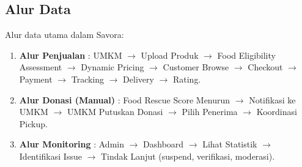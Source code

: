 \subsection{Alur Data}

Alur data utama dalam Savora:

\begin{enumerate}[leftmargin=*]
    \item \textbf{Alur Penjualan} : UMKM $\rightarrow$ Upload Produk $\rightarrow$ Food Eligibility Assessment $\rightarrow$ Dynamic Pricing $\rightarrow$ Customer Browse $\rightarrow$ Checkout $\rightarrow$ Payment $\rightarrow$ Tracking $\rightarrow$ Delivery $\rightarrow$ Rating.
    
    \item \textbf{Alur Donasi (Manual)} : Food Rescue Score Menurun $\rightarrow$ Notifikasi ke UMKM $\rightarrow$ UMKM Putuskan Donasi $\rightarrow$ Pilih Penerima $\rightarrow$ Koordinasi Pickup.
    
    \item \textbf{Alur Monitoring} : Admin $\rightarrow$ Dashboard $\rightarrow$ Lihat Statistik $\rightarrow$ Identifikasi Issue $\rightarrow$ Tindak Lanjut (suspend, verifikasi, moderasi).
\end{enumerate}
